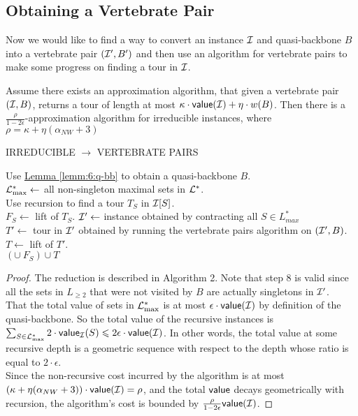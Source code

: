 \documentclass[./main.tex]{subfiles}
\begin{document}
	\subsection{Obtaining a Vertebrate Pair}
	Now we would like to find a way to convert an instance $\mathcal{I}$ and quasi-backbone $B$ into a vertebrate pair $(\mathcal{I}', B')$ and then use an algorithm for vertebrate pairs to make some progress on finding a tour in $\mathcal{I}$.\\
	\begin{theorem}
		Assume there exists an approximation algorithm, that given a vertebrate pair $(\mathcal{I}, B)$, returns a tour of length at most $\kappa\cdot\textsf{\textup{value}}(\mathcal{I}) + \eta\cdot w(B)$. Then there is a $\frac{\rho}{1 - 2\epsilon}$-approximation algorithm for irreducible instances, where $\rho = \kappa + \eta(\alpha_{NW} + 3)$
	\end{theorem}
	\begin{algorithm}\label{alg:6:irr-atsp}
		\caption{IRREDUCIBLE $\rightarrow$ VERTEBRATE PAIRS}
		Use \hyperref[lemm:6:q-bb]{Lemma \ref{lemm:6:q-bb}} to obtain a quasi-backbone $B$.\\
		$\mathcal{L}^*_{\max} \leftarrow $ all non-singleton maximal sets in $\mathcal{L}^*$.\\
		 {
		Use recursion to find a tour $T_S$ in $\mathcal{I}[S]$.\\
		$F_S\leftarrow$ lift of $T_S$.
		}
		$\mathcal{I}'\leftarrow$ instance obtained by contracting all $S\in L_{max}^*$\\
		$T'\leftarrow$ tour in $\mathcal{I}'$ obtained by running the vertebrate pairs algorithm on $(\mathcal{I}', B)$.\\
		$T \leftarrow $ lift of $T'$.\\
		\Return  $\left(\cup\ F_S\right)\cup T$
	\end{algorithm}

	\begin{proof}
		The reduction is described in Algorithm 2. Note that step 8 is valid since all the sets in $L_{\geq 2}$ that were not visited by $B$ are actually singletons in $\mathcal{I}'$.\vspace{2mm}
		\\That the total value of sets in $\mathcal{L}^*_{\max}$ is at most $\epsilon\cdot \textsf{\textup{value}}(\mathcal{I})$ by definition of the quasi-backbone. So the total value of the recursive instances is $\sum_{S\in \mathcal{L}^*_{\max}}2\cdot\textsf{\textup{value}}_{\mathcal{I}}(S)\leqslant 2\epsilon\cdot\textsf{\textup{value}}(\mathcal{I})$. In other words, the total value at some recursive depth is a geometric sequence with respect to the depth whose ratio is equal to $2\cdot\epsilon$.\vspace{2mm}
		\\Since the non-recursive cost incurred by the algorithm is at most $(\kappa + \eta (\alpha_{NW} + 3))\cdot\textsf{\textup{value}}(\mathcal{I}) = \rho$, and the total $\textsf{\textup{value}}$ decays geometrically with recursion, the algorithm's cost is bounded by $\frac{\rho}{1-2\epsilon}\textsf{\textup{value}}(\mathcal{I})$.

	\end{proof}
\end{document}
